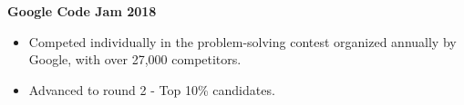 
\begin{multicols}{1}
    \begin{flushleft}
        \textbf{Google Code Jam 2018}
    \end{flushleft}
\end{multicols}

\vspace{-5mm}

\begin{itemize}[noitemsep,leftmargin=*]
    \item Competed individually in the problem-solving contest organized annually by Google, with over 27,000 competitors.
    \item Advanced to round 2 - Top 10\% candidates.
\end{itemize}
